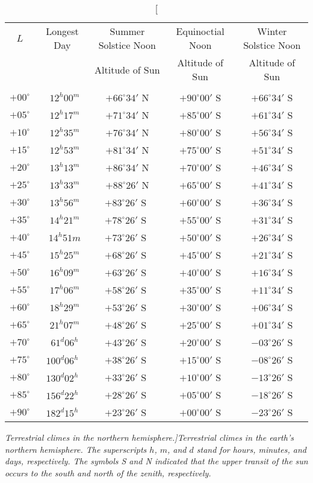 \begin{table}\centering
\begin{tabular}{ccccc}\hline
$L$ & Longest Day & Summer Solstice  Noon& Equinoctial Noon  & Winter Solstice Noon\\
&&Altitude of Sun & Altitude of Sun & Altitude of Sun\\ \hline
&&&&\\[-2ex]
$+00^\circ$ &~$12^h00^m$ & $+66^\circ 34'$ N& $+90^\circ 00 '$ S & $+66^\circ 34'$ S\\
$+05^\circ$ &~$12^h17^m$&$+71^\circ 34'$ N&$+85^\circ 00'$ S&$+61^\circ 34'$ S\\
$+10^\circ$ &~$12^h35^m$&$+76^\circ 34'$ N&$+80^\circ 00'$ S&$+56^\circ 34'$ S\\
$+15^\circ$ &~$12^h53^m$&$+81^\circ 34'$ N&$+75^\circ 00'$ S&$+51^\circ 34'$ S\\
$+20^\circ$ &~$13^h13^m$&$+86^\circ 34'$ N&$+70^\circ 00'$ S&$+46^\circ 34'$ S\\
$+25^\circ$ &~$13^h33^m$&$+88^\circ 26'$ N&$+65^\circ 00'$ S&$+41^\circ 34'$ S\\
$+30^\circ$ &~$13^h56^m$&$+83^\circ 26'$ S\,\,&$+60^\circ 00'$ S&$+36^\circ 34'$ S\\
$+35^\circ$ &~$14^h21^m$&$+78^\circ 26'$ S\,\,&$+55^\circ 00'$ S&$+31^\circ 34'$ S\\
$+40^\circ$ &~$14^h51m$&$+73^\circ 26'$ S\,\,&$+50^\circ 00'$ S&$+26^\circ 34'$ S\\
$+45^\circ$ &~$15^h25^m$&$+68^\circ 26'$ S\,\,&$+45^\circ 00'$ S&$+21^\circ 34'$ S\\
$+50^\circ$ &~$16^h09^m$&$+63^\circ 26'$ S\,\,&$+40^\circ 00'$ S&$+16^\circ 34'$ S\\
$+55^\circ$ &~$17^h06^m$&$+58^\circ 26'$ S\,\,&$+35^\circ 00'$ S&$+11^\circ 34'$ S\\
$+60^\circ$ &~$18^h29^m$&$+53^\circ 26'$ S\,\,&$+30^\circ 00'$ S&$+06^\circ 34'$ S\\
$+65^\circ$ &~$21^h07^m$&$+48^\circ 26'$ S\,\,&$+25^\circ 00'$ S&$+01^\circ 34'$ S\\
$+70^\circ$ &~$61^d 06^h$&$+43^\circ 26'$ S\,\,&$+20^\circ 00'$ S&$-03^\circ 26'$ S\\
$+75^\circ$ &$100^d06^h$&$+38^\circ 26'$ S\,\,&$+15^\circ 00'$ S&$-08^\circ 26'$ S\\
$+80^\circ$ &$130^d02^h$&$+33^\circ 26'$ S\,\,&$+10^\circ 00'$ S&$-13^\circ 26'$ S\\
$+85^\circ$ &$156^d22^h$&$+28^\circ 26'$ S\,\,&$+05^\circ 00'$ S&$-18^\circ 26'$ S\\
$+90^\circ$ &$182^d15^h$&$+23^\circ 26'$ S\,\,&$+00^\circ 00'$ S&$-23^\circ 26'$ S\\
\end{tabular}
\caption[\em Terrestrial climes in the northern hemisphere.]{\em Terrestrial climes in the earth's northern hemisphere. The superscripts $h$, $m$, and $d$ stand for
hours, minutes, and days, respectively. The symbols S and N indicated that the upper transit of the sun occurs to the south and north of the zenith, respectively.}\label{t3}
\end{table}

